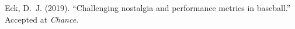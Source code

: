 \documentclass[11pt]{article}\usepackage[]{graphicx}\usepackage[]{color}
\begin{document}
\begin{FlushLeft}
\begin{thebibliography}{00}



Eck, D.~J. (2019).
\newblock ``Challenging nostalgia and performance metrics in baseball.''
\newblock Accepted at \emph{Chance}.











\end{thebibliography}
\end{FlushLeft}
\end{document}
